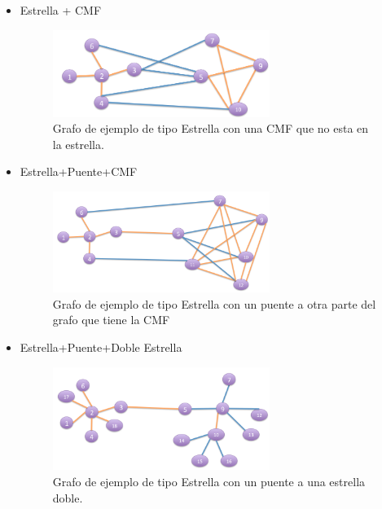 \begin{itemize}
\item Estrella + CMF
 \begin{figure}[H] %
\begin{center}
\includegraphics[width=200pt]{../imgs/Estrella+CMF.jpg}
\caption{Grafo de ejemplo de tipo Estrella con una CMF que no esta en la estrella.}
\end{center}
\end{figure}
\item Estrella+Puente+CMF
 \begin{figure}[H] %
\begin{center}
\includegraphics[width=200pt]{../imgs/Estrella+Puente+CMF.jpg}
\caption{Grafo de ejemplo de tipo Estrella con un puente a otra parte del grafo que tiene la CMF}
\end{center}
\end{figure}
\item Estrella+Puente+Doble Estrella
 \begin{figure}[H] %
\begin{center}
\includegraphics[width=200pt]{../imgs/Estrella+puente+dobleEstrella.jpg}
\caption{Grafo de ejemplo de tipo Estrella con un puente a una estrella doble.}
\end{center}
\end{figure}


\end{itemize}
